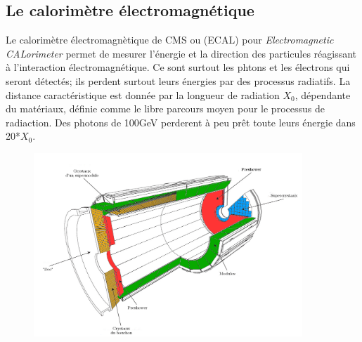 \subsection{Le calorimètre électromagnétique}
Le calorimètre électromagnètique de CMS ou (ECAL) pour \textit{Electromagnetic CALorimeter} permet de mesurer l'énergie et la direction des particules réagissant à l'interaction électromagnétique. Ce sont surtout les phtons et les électrons qui seront détectés; ils perdent surtout leurs énergies par des processus radiatifs. La distance caractéristique est donnée par la longueur de radiation $X_{0}$, dépendante du matériaux, définie comme le libre parcours moyen pour le processus de radiaction. Des photons de 100GeV perderent à peu prêt toute leurs énergie dans 20*$X_{0}$.
\begin{figure}[ht!]
	\centering
	\includegraphics[width=0.90\textwidth]{CMS/ECAL.png}
	\label{pixel2}
\end{figure}

